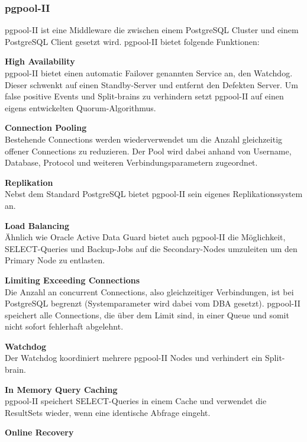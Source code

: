 
\subsubsection{pgpool-II}
\begin{flushleft}
    pgpool-II ist eine Middleware die zwischen einem \Gls{PostgreSQL Cluster} und einem PostgreSQL Client gesetzt wird.
    pgpool-II bietet folgende Funktionen\cite{EXVNLICT,3XWCD3KX}:
\end{flushleft}
\begin{flushleft}
    \textbf{High Availability}\\
    pgpool-II bietet einen automatic \Gls{Failover} genannten Service an, den Watchdog.
    Dieser schwenkt auf einen Standby-Server und entfernt den Defekten Server.
    Um false positive Events und Split-brains zu verhindern setzt pgpool-II auf einen eigens entwickelten \Gls{Quorum}-Algorithmus.
\end{flushleft}
\begin{flushleft}
    \textbf{Connection Pooling}\\
    Bestehende Connections werden wiederverwendet um die Anzahl gleichzeitig offener Connections zu reduzieren.
    Der Pool wird dabei anhand von Username, Database, Protocol und weiteren Verbindungsparametern zugeordnet.
\end{flushleft}
\begin{flushleft}
    \textbf{Replikation}\\
    Nebst dem Standard \Gls{PostgreSQL} bietet pgpool-II sein eigenes Replikationssystem an.
\end{flushleft}
\begin{flushleft}
    \textbf{Load Balancing}\\
    Ähnlich wie Oracle Active Data Guard \cite{6294443C} bietet auch pgpool-II die Möglichkeit, SELECT-Queries und Backup-Jobs auf die Secondary-Nodes umzuleiten um den Primary Node zu entlasten.
\end{flushleft}
\begin{flushleft}
    \textbf{Limiting Exceeding Connections}\\
    Die Anzahl an concurrent Connections, also gleichzeitiger Verbindungen, ist bei \Gls{PostgreSQL} begrenzt (Systemparameter wird dabei vom DBA gesetzt).
    pgpool-II speichert alle Connections, die über dem Limit sind, in einer Queue und somit nicht sofort fehlerhaft abgelehnt.
\end{flushleft}
\begin{flushleft}
    \textbf{Watchdog}\\
    Der Watchdog koordiniert mehrere pgpool-II Nodes und verhindert ein Split-brain.
\end{flushleft}
\begin{flushleft}
    \textbf{In Memory Query Caching}\\
    pgpool-II speichert SELECT-Queries in einem Cache und verwendet die ResultSets wieder, wenn eine identische Abfrage eingeht.
\end{flushleft}
\begin{flushleft}
    \textbf{Online Recovery}\\
\end{flushleft}
